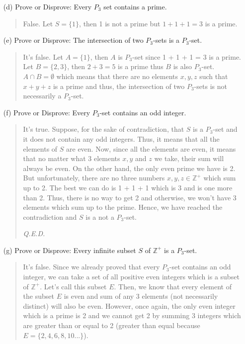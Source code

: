 \documentclass[12pt, a4paper]{article}                      %
\begin{document}
\begin{itemize}
\begin{itemize}
\item[]

\item[(d)]
Prove or Disprove: Every $P_3$ set contains a prime.
\begin{quote}
False. Let $S = \{1\}$, then 1 is not a prime but $1 + 1 + 1 = 3$ is a prime.
\end{quote}

\item[]

\item[(e)]
Prove or Disprove: The intersection of two $P_3$-sets is a $P_3$-set.
\begin{quote}
It's false. Let $A = \{1\}$, then $A$ is $P_3$-set since 1 + 1 + 1 = 3 is a prime.
Let $B = \{2, 3\}$, then $2 + 3 = 5$ is a prime thus $B$ is also $P_3$-set. $A \cap B = \emptyset$
which means that there are no elements $x,y,z$ such that $x + y + z$ is a prime and thus,
the intersection of two $P_3$-sets is not necessarily a $P_3$-set.
\end{quote} 

\item[]

\item[(f)]
Prove or Disprove: Every $P_3$-set contains an odd integer.
\begin{quote}
It's true. Suppose, for the sake of contradiction, that $S$ is a $P_3$-set and it does not contain any odd integers. Thus, it means
that all the elements of $S$ are even. Now, since all the elements are even, it means that no matter
what 3 elements $x, y$ and $z$ we take, their sum will always be even. On the other hand, the only even
prime we have is 2. But unfortunately, there are no three numbers $x, y, z \in \mathbb{Z}^+$ which sum up to 2. The best we can do is 1 + 1 + 1
which is 3 and is one more than 2. Thus, there is no way to get 2 and 
otherwise, we won't have 3 elements which sum up to the prime. Hence,
we have reached the contradiction and $S$ is a not a $P_3$-set.
\begin{flushright}
\textit{Q.E.D.}
\end{flushright}
\end{quote}

\item[]

\item[(g)]
Prove or Disprove: Every infinite subset $S$ of $\mathbb{Z}^+$ is a $P_3$-set.
\begin{quote}
It's false. Since we already proved that every $P_3$-set contains an odd integer,
we can take a set of all positive even integers which is a subset of $\mathbb{Z}^+$. Let's call this subset $E$. Then, we know that every element of the subset $E$ is even and sum of any 3 elements (not necessarily distinct) will also be even. However, once again, the only even integer which is a prime is 2 and we cannot get 2 by summing 3 integers which are greater than or equal to 2 (greater than equal because $E = \{2, 4, 6, 8, 10 ...\}$).
\end{quote}


\end{itemize}
\end{itemize}
\end{document}
